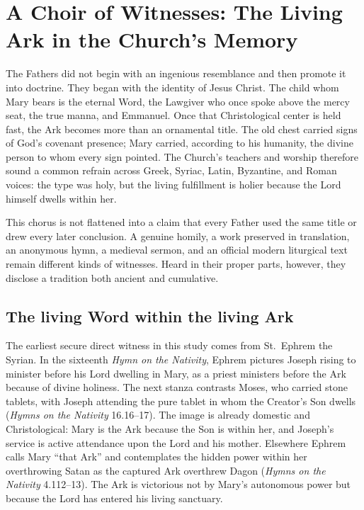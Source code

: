 \section{A Choir of Witnesses: The Living Ark in the Church's Memory}

The Fathers did not begin with an ingenious resemblance and then promote it into
doctrine. They began with the identity of Jesus Christ. The child whom Mary
bears is the eternal Word, the Lawgiver who once spoke above the mercy seat, the
true manna, and Emmanuel. Once that Christological center is held fast, the Ark
becomes more than an ornamental title. The old chest carried signs of God's
covenant presence; Mary carried, according to his humanity, the divine person to
whom every sign pointed. The Church's teachers and worship therefore sound a
common refrain across Greek, Syriac, Latin, Byzantine, and Roman voices: the
type was holy, but the living fulfillment is holier because the Lord himself
dwells within her.

This chorus is not flattened into a claim that every Father used the same title
or drew every later conclusion. A genuine homily, a work preserved in
translation, an anonymous hymn, a medieval sermon, and an official modern
liturgical text remain different kinds of witnesses. Heard in their proper
parts, however, they disclose a tradition both ancient and cumulative.

\subsection{The living Word within the living Ark}

The earliest secure direct witness in this study comes from St.~Ephrem the
Syrian. In the sixteenth \emph{Hymn on the Nativity}, Ephrem pictures Joseph
rising to minister before his Lord dwelling in Mary, as a priest ministers
before the Ark because of divine holiness. The next stanza contrasts Moses,
who carried stone tablets, with Joseph attending the pure tablet in whom the
Creator's Son dwells (\emph{Hymns on the Nativity} 16.16--17). The image is
already domestic and Christological: Mary is the Ark because the Son is within
her, and Joseph's service is active attendance upon the Lord and his mother.
Elsewhere Ephrem calls Mary ``that Ark'' and contemplates the hidden power
within her overthrowing Satan as the captured Ark overthrew Dagon
(\emph{Hymns on the Nativity} 4.112--13). The Ark is victorious not by Mary's
autonomous power but because the Lord has entered his living sanctuary.

